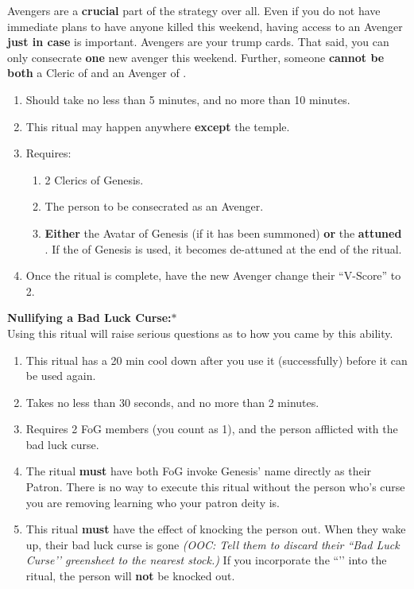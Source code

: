 \documentclass[green]{GL2020}
\begin{document}
Avengers are a \textbf{crucial} part of the \pGoaties{} strategy over all. Even if you do not have immediate plans to have anyone killed this weekend, having access to an Avenger \textbf{just in case} is important. Avengers are your trump cards. That said, you can only consecrate \textbf{one} new avenger this weekend. Further, someone \textbf{cannot be both} a Cleric of \cGenesis{} and an Avenger of \cGenesis{}.

  \begin{enumerate}
    \item Should take no less than 5 minutes, and no more than 10 minutes.
    \item This ritual may happen anywhere \textbf{except} the temple.
    \item Requires:
    \begin{enumerate}
    	\item 2 Clerics of Genesis.
			\item The person to be consecrated as an Avenger.
			\item \textbf{Either} the Avatar of Genesis (if it has been summoned) \textbf{or} the \textbf{attuned} \iHorseshoe{}. If the \iHorseshoe{} of Genesis is used, it becomes de-attuned at the end of the ritual.
    \end{enumerate}
	\item Once the ritual is complete, have the new Avenger change their ``V-Score'' to 2.
 \end{enumerate}
   
\textbf{Nullifying a Bad Luck Curse:}$*$\\
Using this ritual will raise serious questions as to how you came by this ability.

\begin{enumerate}
    \item This ritual has a 20 min cool down after you use it (successfully) before it can be used again.
    \item Takes no less than 30 seconds, and no more than 2 minutes.
    \item Requires 2 FoG members (you count as 1), and the person afflicted with the bad luck curse.
    \item The ritual \textbf{must} have both FoG invoke Genesis’ name directly as their Patron. There is no way to execute this ritual without the person who’s curse you are removing learning who your patron deity is.
		\item This ritual \textbf{must} have the effect of knocking the person out. When they wake up, their bad luck curse is gone \emph{(OOC: Tell them to discard their ``Bad Luck Curse’’ greensheet to the nearest stock.)} If you incorporate the ``\iHorseshoe{}’’ into the ritual, the person will \textbf{not} be knocked out.
  \end{enumerate}
\end{document}
